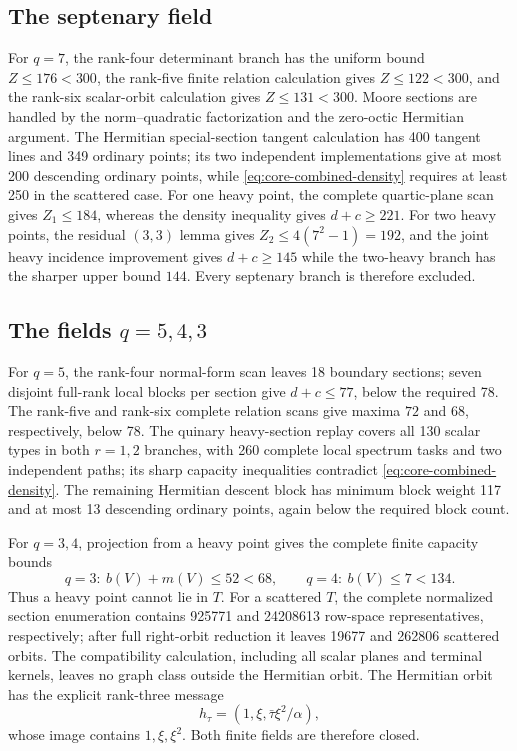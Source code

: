 \documentclass[12pt,letterpaper,onecolumn]{article}
\theoremstyle{definition}
\theoremstyle{remark}
\begin{document}
\subsection{The septenary field}
For \(q=7\), the rank-four determinant branch has the uniform bound
\(Z\le176<300\), the rank-five finite relation calculation gives
\(Z\le122<300\), and the rank-six scalar-orbit calculation gives
\(Z\le131<300\).  Moore sections are handled by the norm--quadratic
factorization and the zero-octic Hermitian argument.  The Hermitian
special-section tangent calculation has 400 tangent lines and 349 ordinary
points; its two independent implementations give at most 200 descending
ordinary points, while \eqref{eq:core-combined-density} requires at least
250 in the scattered case.  For one heavy point, the complete quartic-plane
scan gives \(Z_1\le184\), whereas the density inequality gives
\(d+c\ge221\).  For two heavy points, the residual \((3,3)\) lemma gives
\(Z_2\le4(7^2-1)=192\), and the joint heavy incidence improvement gives
\(d+c\ge145\) while the two-heavy branch has the sharper upper bound
\(144\).  Every septenary branch is therefore excluded.

\subsection{The fields \(q=5,4,3\)}
For \(q=5\), the rank-four normal-form scan leaves 18 boundary sections;
seven disjoint full-rank local blocks per section give \(d+c\le77\), below
the required 78.  The rank-five and rank-six complete relation scans give
maxima \(72\) and \(68\), respectively, below 78.  The quinary heavy-section
replay covers all 130 scalar types in both \(r=1,2\) branches, with
260 complete local spectrum tasks and two independent paths; its sharp
capacity inequalities contradict \eqref{eq:core-combined-density}.  The
remaining Hermitian descent block has minimum block weight 117 and at most
13 descending ordinary points, again below the required block count.

For \(q=3,4\), projection from a heavy point gives the complete finite
capacity bounds
\[
q=3:\ b(V)+m(V)\le52<68,\qquad
q=4:\ b(V)\le7<134.
\]
Thus a heavy point cannot lie in \(T\).  For a scattered \(T\), the complete
normalized section enumeration contains 925771 and 24208613 row-space
representatives, respectively; after full right-orbit reduction it leaves
19677 and 262806 scattered orbits.  The compatibility calculation, including
all scalar planes and terminal kernels, leaves no graph class outside the
Hermitian orbit.  The Hermitian orbit has the explicit rank-three message
\[
h_\tau=(1,\xi,\bar\tau\xi^2/\alpha),
\]
whose image contains \(1,\xi,\xi^2\).  Both finite fields are therefore
closed.
\end{document}
